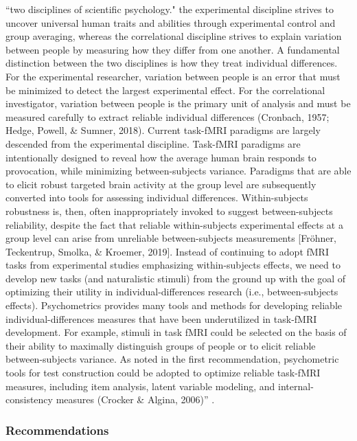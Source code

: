 %
``two disciplines of scientific psychology."
the experimental discipline strives to uncover universal human traits and
abilities through experimental control and group averaging, whereas the
correlational discipline strives to explain variation between people by
measuring how they differ from one another.
%
A fundamental distinction between the two disciplines is how they treat
individual differences.
%
For the experimental researcher, variation between people is an error that must
be minimized to detect the largest experimental effect.
%
For the correlational investigator, variation between people is the primary unit
of analysis and must be measured carefully to extract reliable individual
differences (Cronbach, 1957; Hedge, Powell, \& Sumner, 2018).
%
Current task-fMRI paradigms are largely descended from the experimental
discipline.
%
Task-fMRI paradigms are intentionally designed to reveal how the average human
brain responds to provocation, while minimizing between-subjects variance.
%
Paradigms that are able to elicit robust targeted brain activity at the group
level are subsequently converted into tools for assessing individual
differences.
%
Within-subjects robustness is, then, often inappropriately invoked to suggest
between-subjects reliability, despite the fact that reliable within-subjects
experimental effects at a group level can arise from unreliable between-subjects
measurements [Fröhner, Teckentrup, Smolka, \& Kroemer, 2019].
%
Instead of continuing to adopt fMRI tasks from experimental studies emphasizing
within-subjects effects, we need to develop new tasks (and naturalistic stimuli)
from the ground up with the goal of optimizing their utility in
individual-differences research (i.e., between-subjects effects).
%
Psychometrics provides many tools and methods for developing reliable
individual-differences measures that have been underutilized in task-fMRI
development.
%
For example, stimuli in task fMRI could be selected on the basis of their
ability to maximally distinguish groups of people or to elicit reliable
between-subjects variance.
%
As noted in the first recommendation, psychometric tools for test construction
could be adopted to optimize reliable task-fMRI measures, including item
analysis, latent variable modeling, and internal-consistency measures (Crocker
\& Algina, 2006)'' \citep{elliott2020test}.


\subsubsection{Recommendations}

